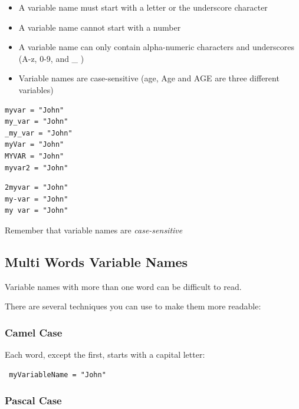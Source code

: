 \documentclass[12pt,a4paper]{article}
\begin{document}
\begin{itemize}
	\item A variable name must start with a letter or the underscore character
	\item A variable name cannot start with a number
	\item A variable name can only contain alpha-numeric characters and underscores (A-z, 0-9, and \_ )
	\item Variable names are case-sensitive (age, Age and AGE are three different variables)
\end{itemize}

\begin{ebox}
	\begin{lstlisting}
myvar = "John"
my_var = "John"
_my_var = "John"
myVar = "John"
MYVAR = "John"
myvar2 = "John"
	\end{lstlisting}
\end{ebox}

\begin{abox}
	\begin{lstlisting}
2myvar = "John"
my-var = "John"
my var = "John"
	\end{lstlisting}
\end{abox}

\begin{nbox}
	Remember that variable names are \textit{case-sensitive}
\end{nbox}
\subsection{Multi Words Variable Names}
Variable names with more than one word can be difficult to read.

There are several techniques you can use to make them more readable:

\subsubsection{Camel Case}

Each word, except the first, starts with a capital letter:

\begin{ebox}
	\begin{lstlisting}
 myVariableName = "John"
	\end{lstlisting}
\end{ebox}

\subsubsection{Pascal Case}
\end{document}
